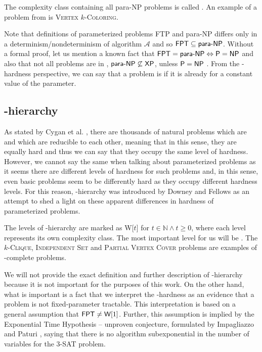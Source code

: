 The complexity class containing all para-NP problems is called \pNP.
An example of a problem from \pNP is \textsc{Vertex} $k$-\textsc{Coloring}.

Note that definitions of parameterized problems FTP and para-NP differs only in a determinism/nondeterminism of
algorithm $\mathcal{A}$ and so $\textsf{FPT} \subseteq \textsf{para-NP}$.
Without a formal proof, let us mention a known fact that $\textsf{FPT} = \textsf{para-NP} \Leftrightarrow \textsf{P} = \textsf{NP}$ \cite[p.~39]{Flum2006}
and also that not all \pNP problems are in \XP, $\textsf{para-NP} \not\subseteq \textsf{XP}$, unless $\textsf{P} = \textsf{NP}$ \cite[p.~41]{Flum2006}.
From the \pNP-hardness perspective, we can say that a problem is \pNPh if it is \NPh already for a constant value of the parameter.


\subsection{\W-hierarchy}

As stated by Cygan et al. \cite[p.~423]{Cygan2015},
there are thousands of natural problems which are \NPc and which are reducible to each other,
meaning that in this sense, they are equally hard and thus we can say that
they occupy the same level of hardness.
However, we cannot say the same when talking about parameterized problems as it seems there are
different levels of hardness for such problems and, in this sense, even basic problems
seem to be differently hard as they occupy different hardness levels.
For this reason, \W-hierarchy was introduced by Downey and Fellows \cite{Downey1999} as
an attempt to shed a light on these apparent differences in hardness of parameterized problems. 

The levels of \W-hierarchy are marked as \textsf{W}[$t$] for $t \in \mathbb{N} \wedge t \geq 0$,
where each level represents its own complexity class.
The most important level for us will be \Wone.
The $k$-\textsc{Clique}, \textsc{Independent Set} and \textsc{Partial Vertex Cover} problems
are examples of \Wone-complete problems.

We will not provide the exact definition and further description of \W-hierarchy
because it is not important for the purposes of this work.
On the other hand, what is important is a fact that we interpret the \W-hardness as an evidence that
a problem is not fixed-parameter tractable.
This interpretation is based on a general assumption that $\textsf{FPT} \neq \textsf{W}[1]$.
Further, this assumption is implied by the Exponential Time Hypothesis -- unproven conjecture,
formulated by Impagliazzo and Paturi \cite{Impagliazzo1999}, saying that there is no
algorithm subexponential in the number of variables for the $3$-\textsc{SAT} problem.
